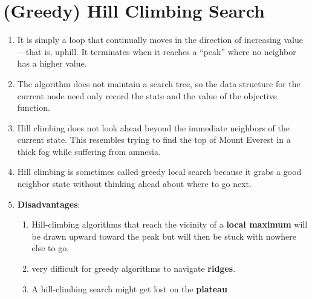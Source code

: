 \section{(Greedy) Hill Climbing Search \cite{ai/book/Artificial-Intelligence-A-Modern-Approach/Russell-Norvig}}
\label{AI: Algorithms/(Greedy) Hill Climbing Search}


\begin{enumerate}
    \item It is simply a loop that continually moves in the direction of increasing value—that is, uphill. 
    It terminates when it reaches a “peak” where no neighbor has a higher value.
    \hfill \cite{ai/book/Artificial-Intelligence-A-Modern-Approach/Russell-Norvig}

    \item The algorithm does not maintain a search tree, so the data structure for the current node need only record the state and the value of the objective function. 
    \hfill \cite{ai/book/Artificial-Intelligence-A-Modern-Approach/Russell-Norvig}

    \item Hill climbing does not look ahead beyond the immediate neighbors of the current state. This resembles trying to find the top of Mount Everest in a thick fog while suffering from amnesia.
    \hfill \cite{ai/book/Artificial-Intelligence-A-Modern-Approach/Russell-Norvig}

    \item Hill climbing is sometimes called greedy local search because it grabs a good neighbor state without thinking ahead about where to go next.
    \hfill \cite{ai/book/Artificial-Intelligence-A-Modern-Approach/Russell-Norvig}

    \item \textbf{Disadvantages}:
    \begin{enumerate}
        \item  Hill-climbing algorithms that reach the vicinity of a \textbf{local maximum} will be drawn upward toward the peak but will then be stuck with nowhere else to go. 
        \hfill \cite{ai/book/Artificial-Intelligence-A-Modern-Approach/Russell-Norvig}

        \item very difficult for greedy algorithms to navigate \textbf{ridges}.
        \hfill \cite{ai/book/Artificial-Intelligence-A-Modern-Approach/Russell-Norvig}

        \item A hill-climbing search might get lost on the \textbf{plateau}
        \hfill \cite{ai/book/Artificial-Intelligence-A-Modern-Approach/Russell-Norvig}
    \end{enumerate}
\end{enumerate}

